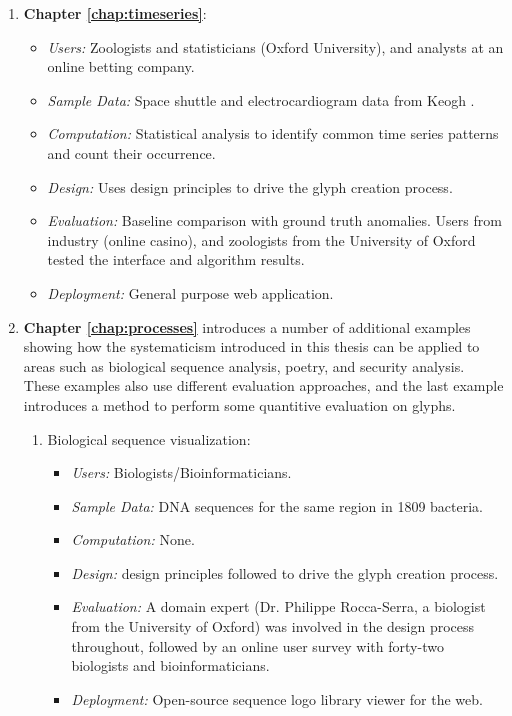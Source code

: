 \begin{enumerate}
\item \textbf{Chapter \ref{chap:timeseries}}:
\begin{itemize}
\item \emph{Users:} Zoologists and statisticians (Oxford University), and analysts at an online betting company.
\item \emph{Sample Data:} Space shuttle and electrocardiogram data from Keogh \etal \cite{shuttle_data} .
\item \emph{Computation:} Statistical analysis to identify common time series patterns and count their occurrence.
\item \emph{Design:} Uses design principles to drive the glyph creation process.
\item \emph{Evaluation:} Baseline comparison with ground truth anomalies. Users from industry (online casino), and zoologists from the University of Oxford tested the interface and algorithm results.
\item \emph{Deployment:} General purpose web application.
\end{itemize}

\item \textbf{Chapter \ref{chap:processes}} introduces a number of additional examples showing how the systematicism introduced in this thesis can be applied to areas such as biological sequence analysis, poetry, and security analysis.
These examples also use different evaluation approaches, and the last example introduces a method to perform some quantitive evaluation on glyphs.
\begin{enumerate}
\item Biological sequence visualization:
\begin{itemize}
\item \emph{Users:} Biologists/Bioinformaticians.
\item \emph{Sample Data:} DNA sequences for the same region in 1809 bacteria.
\item \emph{Computation:} None.
\item \emph{Design:} design principles followed to drive the glyph creation process.
\item \emph{Evaluation:} A domain expert (Dr. Philippe Rocca-Serra, a biologist from the University of Oxford) was involved in the design process throughout, followed by an online user survey with forty-two biologists and bioinformaticians.
\item \emph{Deployment:} Open-source sequence logo library viewer for the web.
\end{itemize}


\end{enumerate}
\end{enumerate}
